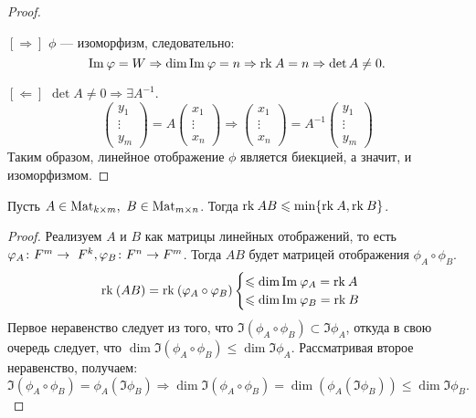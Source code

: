 \begin{proof}
\ 
\par $[\Rightarrow]$ $\phi$ --- изоморфизм, следовательно:
    \[
        \Im \phi = W \Rightarrow \dim \Im \phi = n \Rightarrow \rk A = n
        \Rightarrow \det A \neq 0.
    \]
\par $[\Leftarrow]$ $\det A \neq 0 \Rightarrow \exists A^{-1}$.
\[ \begin{pmatrix} 
    y_1\\
    \vdots\\
    y_m
\end{pmatrix} = A 
\begin{pmatrix}
x_1\\
\vdots\\
x_n
\end{pmatrix}
\Rightarrow 
\begin{pmatrix}
x_1\\
\vdots\\
x_n
\end{pmatrix} = A^{-1} \begin{pmatrix} 
    y_1\\
    \vdots\\
    y_m
\end{pmatrix}
\]
Таким образом, линейное отображение $\phi$ является биекцией, а значит, и изоморфизмом.
\end{proof}

\begin{Consequence}
    Пусть $A \in \Mat_{k\times m},\ B\in \Mat_{m\times n}$. Тогда $\rk AB \leqslant \min\{\rk A, \rk B\}$.
\end{Consequence}

\begin{proof}
    Реализуем $A$ и $B$ как матрицы линейных отображений, то есть $\phi_A\colon F^m \rightarrow~F^k,\\ \phi_B\colon F^n \rightarrow F^m$. Тогда $AB$ будет матрицей отображения $\phi_A \circ \phi_B$.
    \[
        \rk(AB) = \rk (\phi_A\circ\phi_B)
        \begin{cases}
            \leqslant \dim \Im \phi_A = \rk A \\
            \leqslant \dim \Im \phi_B = \rk B 

        \end{cases}
    \]
Первое неравенство следует из того, что $\Im(\phi_A\circ \phi_B) \subset \Im \phi_A$, откуда в свою очередь следует, что $\dim \Im (\phi_A\circ \phi_B) \leqslant \dim \Im \phi_A$. Рассматривая второе неравенство, получаем: 
    \[
        \Im (\phi_A\circ \phi_B) = \phi_A(\Im \phi_B) \Rightarrow \dim \Im (\phi_A\circ \phi_B)= \dim(\phi_A(\Im\phi_B)) \leqslant \dim\Im \phi_B.
    \]
\end{proof}


